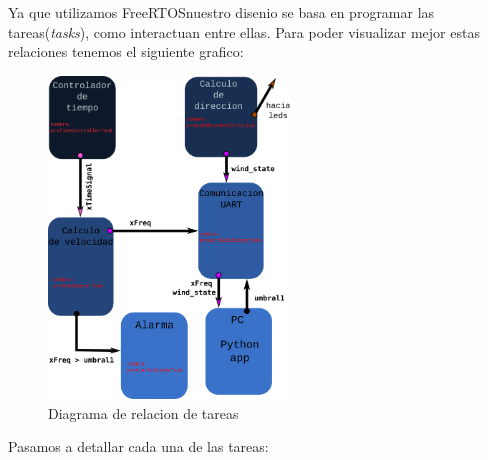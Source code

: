 \documentclass[10pt]{article}
\begin{document}
Ya que utilizamos FreeRTOS\texttrademark nuestro disenio se basa en programar las tareas(\textit{tasks}),  como interactuan entre ellas. Para poder visualizar mejor estas relaciones tenemos el siguiente grafico:
\begin{figure}[H]
   \centering
   \includegraphics[width=0.57\textwidth]{./Images/Tasks.png}
   \caption{Diagrama de relacion de tareas}\label{fig:Task}
\end{figure}
Pasamos a detallar cada una de las tareas:
\end{document}
